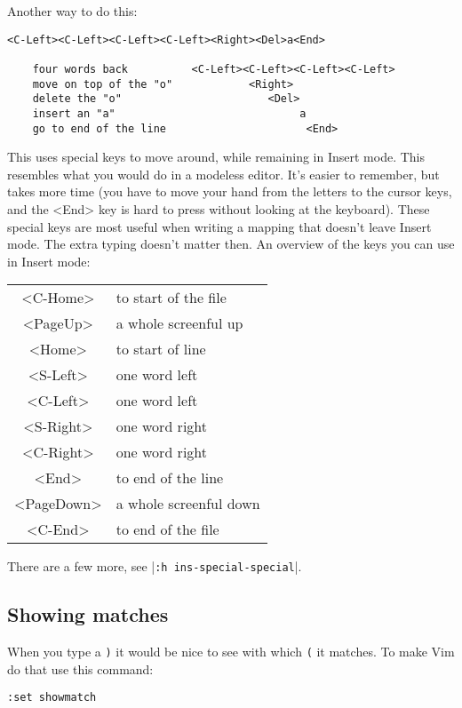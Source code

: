 Another way to do this:

\begin{Verbatim}[samepage=true]
     <C-Left><C-Left><C-Left><C-Left><Right><Del>a<End>

    four words back          <C-Left><C-Left><C-Left><C-Left>
    move on top of the "o"            <Right>
    delete the "o"                       <Del>
    insert an "a"                             a
    go to end of the line                      <End>
\end{Verbatim}

This uses special keys to move around, while remaining in Insert mode.
This resembles what you would do in a modeless editor.
It's easier to remember, but takes more time (you have to move your hand from the letters to the cursor keys, and the <End> key is hard to press without looking at the keyboard).
These special keys are most useful when writing a mapping that doesn't leave Insert mode.
The extra typing doesn't matter then.
An overview of the keys you can use in Insert mode:

\begin{center} \begin{tabular}{c l}
				<C-Home> & to start of the file \\
				<PageUp> & a whole screenful up \\
				<Home> & to start of line \\
				<S-Left> & one word left \\
				<C-Left> & one word left \\
				<S-Right> & one word right \\
				<C-Right> & one word right \\
				<End> & to end of the line \\
				<PageDown> & a whole screenful down \\
				<C-End> & to end of the file
\end{tabular} \end{center}

There are a few more, see |\verb!:h ins-special-special!|.
\subsection{Showing matches}
When you type a \verb!)! it would be nice to see with which \verb!(! it matches.
To make Vim do that use this command:

\begin{Verbatim}[samepage=true]
 :set showmatch
\end{Verbatim}


